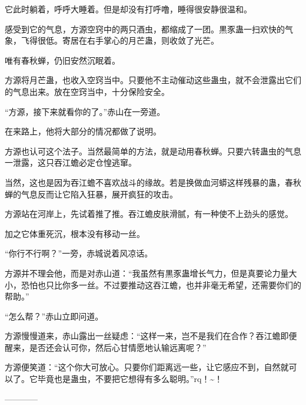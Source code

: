 \begin{this_body}
它此时躺着，呼呼大睡着。但是却没有打呼噜，睡得很安静很温和。

感受到它的气息，方源空窍中的两只酒虫，都缩成了一团。黒豕蛊一扫欢快的气象，飞得很低。寄居在右手掌心的月芒蛊，则收敛了光芒。

唯有春秋蝉，仍旧安然沉眠着。

方源将月芒蛊，也收入空窍当中。只要他不主动催动这些蛊虫，就不会泄露出它们的气息出来。放在空窍当中，十分保险安全。

“方源，接下来就看你的了。”赤山在一旁道。

在来路上，他将大部分的情况都做了说明。

方源也认可这个法子。当然最简单的方法，就是动用春秋蝉。只要六转蛊虫的气息一泄露，这只吞江蟾必定仓惶逃窜。

当然，这也是因为吞江蟾不喜欢战斗的缘故。若是换做血河蟒这样残暴的蛊，春秋蝉的气息反而让它陷入狂暴，展开疯狂的攻击。

方源站在河岸上，先试着推了推。吞江蟾皮肤滑腻，有一种使不上劲头的感觉。

加之它体重死沉，根本没有移动一丝。

“你行不行啊？”一旁，赤城说着风凉话。

方源并不理会他，而是对赤山道：“我虽然有黒豕蛊增长气力，但是真要论力量大小，恐怕也只比你多一丝。不过要推动这吞江蟾，也并非毫无希望，还需要你们的帮助。”

“怎么帮？”赤山立即问道。

方源慢慢道来，赤山露出一丝疑虑：“这样一来，岂不是我们在合作？吞江蟾即便醒来，是否还会认可你，然后心甘情愿地认输远离呢？”

方源便笑道：“这个你大可放心。只要你们距离远一些，让它感应不到，自然就可以了。它毕竟也是蛊虫，不要把它想得有多么聪明。”rq！\~{}！

------------

\end{this_body}

